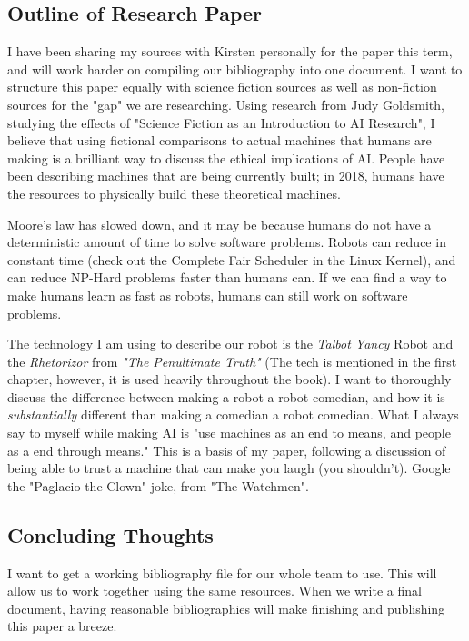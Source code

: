 \documentclass[onecolumn, draftclsnofoot,10pt, compsoc]{IEEEtran}
\begin{document}
\subsection{Outline of Research Paper}
	I have been sharing my sources with Kirsten personally for the paper this term, and will work harder on compiling our bibliography into one document. I want to structure this paper equally with science fiction sources as well as non-fiction sources for the "gap" we are researching. Using research from Judy Goldsmith, studying the effects of "Science Fiction as an Introduction to AI Research", I believe that using fictional comparisons to actual machines that humans are making is a brilliant way to discuss the ethical implications of AI. People have been describing machines that are being currently built; in 2018, humans have the resources to physically build these theoretical machines.

	Moore's law has slowed down, and it may be because humans do not have a deterministic amount of time to solve software problems. Robots can reduce in constant time (check out the Complete Fair Scheduler in the Linux Kernel), and can reduce NP-Hard problems faster than humans can. If we can find a way to make humans learn as fast as robots, humans can still work on software problems.

	The technology I am using to describe our robot is the \textit{Talbot Yancy} Robot and the \textit{Rhetorizor} from \textit{"The Penultimate Truth"} (The tech is mentioned in the first chapter, however, it is used heavily throughout the book). I want to thoroughly discuss the difference between making a robot a robot comedian, and how it is \textit{substantially} different than making a comedian a robot comedian. What I always say to myself while making AI is "use machines as an end to means, and people as a end through means." This is a basis of my paper, following a discussion of being able to trust a machine that can make you laugh (you shouldn't). Google the "Paglacio the Clown" joke, from "The Watchmen".

\subsection{Concluding Thoughts}
 I want to get a working bibliography file for our whole team to use. This will allow us to work together using the same resources. When we write a final document, having reasonable bibliographies will make finishing and publishing this paper a breeze.
\end{document}

